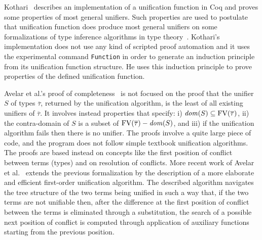 Kothari~ describes an implementation of a unification
function in Coq and proves some properties of most general
unifiers. Such properties are used to postulate that unification
function does produce most general unifiers on some formalizations of
type inference algorithms in type
theory~. Kothari's implementation does not use
any kind of scripted proof automation and it uses the experimental
command \texttt{Function} in order to generate an induction principle
from its unification function structure. He uses this induction
principle to prove properties of the defined unification function.

Avelar et al.'s proof of completeness~ is not
focused on the proof that the unifier $S$ of types $\overline{\tau}$,
returned by the unification algorithm, is the least of all existing
unifiers of $\overline{\tau}$.  It involves instead properties that
specify: i) $\text{\it dom\/}(S) \subseteq \text{FV}(\overline{\tau})$, ii) the
contra-domain of $S$ is a subset of $\text{FV}(\overline{\tau}) - \text{\it dom\/}(S)$,
and iii) if the unification algorithm fails then there is no
unifier. The proofs involve a quite large piece of code, and the
program does not follow simple textbook unification algorithms. The
proofs are based instead on concepts like the first position of
conflict between terms (types) and on resolution of conflicts. More
recent work of Avelar et al.~\cite{AvelarGMA14} extends the previous
formalization by the description of a more elaborate and efficient
first-order unification algorithm. The described algorithm navigates
the tree structure of the two terms being unified in such a way that,
if the two terms are not unifiable then, after the difference at the
first position of conflict between the terms is eliminated through a
substitution, the search of a possible next position of conflict is
computed through application of auxiliary functions starting from the
previous position.

